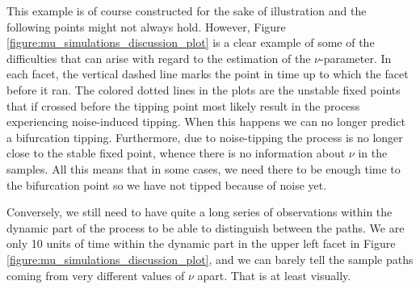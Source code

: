 This example is of course constructed for the sake of illustration and the following points might not always hold. However, Figure \ref{figure:mu_simulations_discussion_plot} is a clear example of some of the difficulties that can arise with regard to the estimation of the $\nu$-parameter. In each facet, the vertical dashed line marks the point in time up to which the facet before it ran. The colored dotted lines in the plots are the unstable fixed points that if crossed before the tipping point most likely result in the process experiencing noise-induced tipping. When this happens we can no longer predict a bifurcation tipping. Furthermore, due to noise-tipping the process is no longer close to the stable fixed point, whence there is no information about $\nu$ in the samples. All this means that in some cases, we need there to be enough time to the bifurcation point so we have not tipped because of noise yet.

Conversely, we still need to have quite a long series of observations within the dynamic part of the process to be able to distinguish between the paths. We are only 10 units of time within the dynamic part in the upper left facet in Figure \ref{figure:mu_simulations_discussion_plot}, and we can barely tell the sample paths coming from very different values of $\nu$ apart. That is at least visually.


